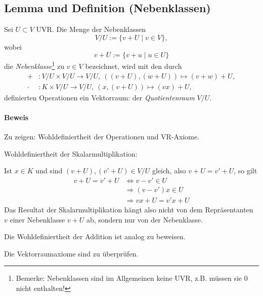  \subsection{Lemma und Definition (Nebenklassen)}
 	\begin{Definition}[Nebenklassen]
 		Sei $U\subset V$ UVR. Die Menge der Nebenklassen
 		\[
 			V/U := \{v+U\mid v\in V\},
 		\]
 		wobei
 		\[
 			v+U:=\{v+u\mid u\in U\}
 		\]
 		die \emph{Nebenklasse}\footnote{Bemerke: Nebenklassen sind im Allgemeinen keine UVR, z.B. müssen sie $0$ nicht enthalten!} zu $v\in V$ bezeichnet, wird mit den durch
 		\begin{align*}
 			+     & : V/U \times V/U \to V/U,\ ((v+U),(w+U))\mapsto (v+w)+U, \\
 			\cdot & : K\times V/U \to V/U,\ (x,(v+U))\mapsto (vx)+U,
 		\end{align*}
 		definierten Operationen ein Vektorraum: der \emph{Quotientenraum} $V/U$.
 	\end{Definition}

 	\paragraph{Beweis}
 		Zu zeigen: Wohldefiniertheit der Operationen und VR-Axiome.

 		Wohldefiniertheit der Skalarmultiplikation:

 		Ist $x\in K$ und sind $(v+U),(v'+U)\in V/U$ gleich, also $v+U = v'+U$, so gilt
 		\begin{align*}
 			v+U = v'+U & \Leftrightarrow v - v'\in U \\
 			           & \Rightarrow (v-v')x \in U   \\
 			           & \Rightarrow vx+U=v' x+U
 		\end{align*}
 		Das Resultat der Skalarmultiplikation hängt also nicht von dem Repräsentanten $v$ einer Nebenklasse $v+U$ ab, sondern nur von der Nebenklasse.

 		Die Wohldefiniertheit der Addition ist analog zu beweisen.

 		Die Vektorraumaxiome sind zu überprüfen.

